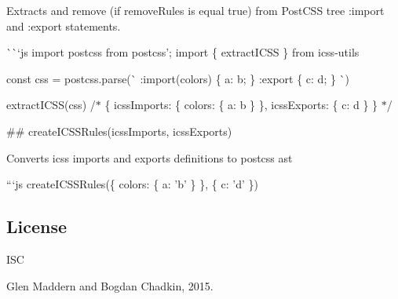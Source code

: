 Extracts and remove (if remove\+Rules is equal true) from Post\+C\+SS tree {\ttfamily \+:import} and {\ttfamily \+:export} statements.

\`{}\`{}`js import postcss from \textquotesingle{}postcss'; import \{ extract\+I\+C\+SS \} from \textquotesingle{}icss-\/utils\textquotesingle{}

const css = postcss.\+parse(\`{} \+:import(colors) \{ a\+: b; \} \+:export \{ c\+: d; \} \`{})

extract\+I\+C\+S\+S(css) /$\ast$ \{ icss\+Imports\+: \{ colors\+: \{ a\+: \textquotesingle{}b\textquotesingle{} \} \}, icss\+Exports\+: \{ c\+: \textquotesingle{}d\textquotesingle{} \} \} $\ast$/ 
\begin{DoxyCode}
## createICSSRules(icssImports, icssExports)

Converts icss imports and exports definitions to postcss ast

```js
createICSSRules(\{
  colors: \{
    a: 'b'
  \}
\}, \{
  c: 'd'
\})
\end{DoxyCode}


\subsection*{License}

I\+SC 

 Glen Maddern and Bogdan Chadkin, 2015. 